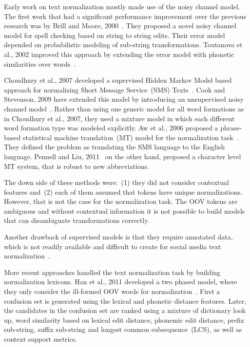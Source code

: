\documentclass[a4paper,onesided,12pt]{report}
\begin{document}
Early work on text normalization mostly made use of the noisy channel model. The first work that had a significant performance improvement over the previous research was by Brill and Moore, 2000~\cite{Brill:2000:IEM:1075218.1075255}. They proposed a novel noisy channel model for spell checking based on string to string edits. Their error model depended on probabilistic modeling of sub-string transformations. Toutanova et al., 2002 improved this approach by extending the error model with phonetic similarities over words~\cite{Toutanova:2002:PMI:1073083.1073109}.

Choudhury et al., 2007 developed a supervised Hidden Markov Model based approach for normalizing Short Message Service~(SMS) Texts~\cite{Choudhury:2007:IMS:1326044.1326048}. Cook and Stevenson, 2009 have extended this model by introducing an unsupervised noisy channel model~\cite{Cook:2009:UMT:1642011.1642021}. Rather than using one generic model for all word formations as in Choudhury et al., 2007, they used a mixture model in which each different word formation type was modeled explicitly. Aw et al., 2006 proposed a phrase-based statistical machine translation~(MT) model for the normalization task~\cite{Aw:2006:PSM:1273073.1273078}. They defined the problem as translating the SMS language to the English language. Pennell and Liu, 2011~\cite{pennell2011character} on the other hand, proposed a character level MT system, that is robust to new abbreviations.

The down side of these methods were:~(1) they did not consider contextual features and~(2) each of them assumed that tokens have unique normalizations. However, that is not the case for the normalization task. The OOV tokens are ambiguous and without contextual information it is not possible to build models that can disambiguate transformations correctly.

Another drawback of supervised models is that they require annotated data, which is not readily available and difficult to create for social media text normalization~\cite{DBLP:conf/emnlp/YangE13}.

More recent approaches handled the text normalization task by building normalization lexicons. Han et al., 2011 developed a two phased model, where they only consider the ill-formed OOV words for normalization~\cite{Han:2011:LNS:2002472.2002520}. First a confusion set is generated using the lexical and phonetic distance features. Later, the candidates in the confusion set are ranked using a mixture of dictionary look up, word similarity based on lexical edit distance, phonemic edit distance, prefix sub-string, suffix sub-string and longest common subsequence~(LCS), as well as context support metrics.
\end{document}
